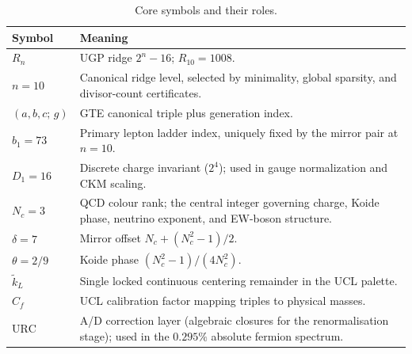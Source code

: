 \documentclass[11pt]{article}
\theoremstyle{remark}
\newcommand{\Cf}{C_{\!f}}
\newcommand{\URC}{\text{URC}}
\begin{document}
\begin{table}[H]
\centering
\caption{Core symbols and their roles.}
\label{tab:symbol_glossary}
\small
\renewcommand{\arraystretch}{1.12}
\begin{tabularx}{\linewidth}{@{}p{2.0cm}X@{}}
\toprule
\textbf{Symbol} & \textbf{Meaning} \\
\midrule
$R_n$ & UGP ridge $2^n-16$; $R_{10}=1008$. \\
$n=10$ & Canonical ridge level, selected by minimality, global sparsity, and divisor-count certificates. \\
$(a,b,c;\,g)$ & GTE canonical triple plus generation index. \\
$b_1=73$ & Primary lepton ladder index, uniquely fixed by the mirror pair at $n=10$. \\
$D_1=16$ & Discrete charge invariant ($2^4$); used in gauge normalization and CKM scaling. \\
$N_c=3$ & QCD colour rank; the central integer governing charge, Koide phase, neutrino exponent, and EW-boson structure. \\
$\delta=7$ & Mirror offset $N_c+(N_c^2{-}1)/2$. \\
$\theta=2/9$ & Koide phase $(N_c^2{-}1)/(4N_c^2)$. \\
$\tilde{k}_L$ & Single locked continuous centering remainder in the UCL palette. \\
$\Cf$ & UCL calibration factor mapping triples to physical masses. \\
$\URC$ & A/D correction layer (algebraic closures for the renormalisation stage); used in the $0.295\%$ absolute fermion spectrum. \\
\bottomrule
\end{tabularx}
\end{table}
\end{document}
